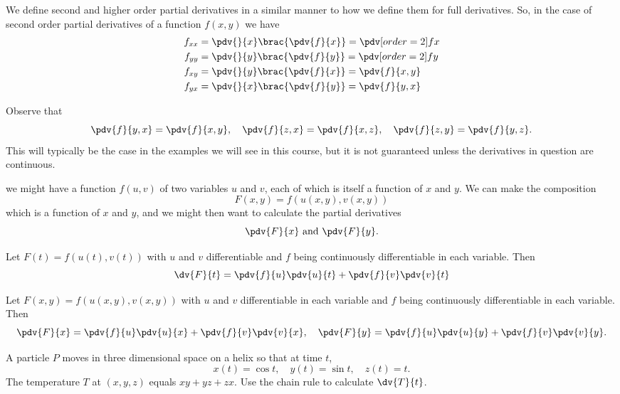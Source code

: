 We define second and higher order partial derivatives in a similar manner to how we define them for full derivatives. So, in the case of second order partial derivatives of a function $f(x,y)$ we have
\[ \begin{split}
f_{xx} &= \pdv{}{x}\brac{\pdv{f}{x}} = \pdv[order={2}]{f}{x} \\
f_{yy} &= \pdv{}{y}\brac{\pdv{f}{y}} = \pdv[order={2}]{f}{y} \\
f_{xy} &= \pdv{}{y}\brac{\pdv{f}{x}} = \pdv{f}{x,y} \\
f_{yx} &= \pdv{}{x}\brac{\pdv{f}{y}} = \pdv{f}{y,x}
\end{split} \]

Observe that
\[ \pdv{f}{y,x}=\pdv{f}{x,y}, \quad \pdv{f}{z,x}=\pdv{f}{x,z}, \quad \pdv{f}{z,y}=\pdv{f}{y,z}. \]
This will typically be the case in the examples we will see in this course, but it is not guaranteed unless the derivatives in question are continuous.

we might have a function $f(u,v)$ of two variables $u$ and $v$, each of which is itself a function of $x$ and $y$. We can make the composition
\[ F(x,y)=f(u(x,y),v(x,y)) \]
which is a function of $x$ and $y$, and we might then want to calculate the partial derivatives
\[ \pdv{F}{x}\text{ and }\pdv{F}{y}. \]

\begin{theorem}
Let $F(t)=f(u(t),v(t))$ with $u$ and $v$ differentiable and $f$ being continuously differentiable in each variable. Then
\begin{equation}
\dv{F}{t}=\pdv{f}{u}\pdv{u}{t}+\pdv{f}{v}\pdv{v}{t}
\end{equation}
\end{theorem}

\begin{corollary}
Let $F(x,y)=f(u(x,y),v(x,y))$ with $u$ and $v$ differentiable in each variable and $f$ being continuously differentiable in each variable. Then
\[ \pdv{F}{x}=\pdv{f}{u}\pdv{u}{x}+\pdv{f}{v}\pdv{v}{x}, \quad \pdv{F}{y}=\pdv{f}{u}\pdv{u}{y}+\pdv{f}{v}\pdv{v}{y}. \]
\end{corollary}

\begin{exercise}{}{}
A particle $P$ moves in three dimensional space on a helix so that at time $t$,
\[ x(t)=\cos t, \quad y(t)=\sin t, \quad z(t)=t. \]
The temperature $T$ at $(x,y,z)$ equals $xy+yz+zx$. Use the chain rule to calculate $\dv{T}{t}$.
\end{exercise}

